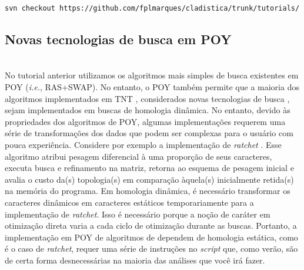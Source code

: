 \begin{center}
\small \texttt{svn checkout https://github.com/fplmarques/cladistica/trunk/tutorials/}\\
\end{center}


\newpage
\pagestyle{fancy} %
\begin{refsection}
\renewcommand*{\finalnamedelim}{\addspace\&\space} %
%
\newcommand{\A}{\textcolor{green}{\textbf{A}}}
\newcommand{\C}{\textcolor{blue}{\textbf{C}}}
\newcommand{\G}{\textcolor{gray}{\textbf{G}}}
\newcommand{\T}{\textcolor{red}{\textbf{T}}}
\newcommand{\gap}{\textcolor{black}{\textbf{-}}}


\section{Novas tecnologias de busca em POY}\label{tut10:search}\\

No tutorial anterior utilizamos os algoritmos mais simples de busca existentes em POY (\textit{i.e.}, RAS+SWAP). No entanto, o POY também permite que a maioria dos algoritmos implementados em TNT \parencite{GoloboffEtAl_2008}, considerados novas tecnologias de busca \parencite{Goloboff_1999,Nixon_1999}, sejam implementados em buscas de homologia dinâmica. No entanto, devido às propriedades dos algoritmos de POY, algumas implementações requerem uma série de transformações dos dados que podem ser complexas para o usuário com pouca experiência. Considere por exemplo a implementação de \textit{ratchet} \parencite{Nixon_1999}. Esse algoritmo atribui pesagem diferencial à uma proporção de seus caracteres, executa busca e refinamento na matriz, retorna ao esquema de pesagem inicial e avalia o custo da(s) topologia(s) em comparação àquela(s) inicialmente retida(s) na memória do programa. Em homologia dinâmica, é necessário transformar os caracteres dinâmicos em caracteres estáticos temporariamente para a implementação de \textit{ratchet}. Isso é necessário porque a noção de caráter em otimização direta varia a cada ciclo de otimização durante as buscas. Portanto, a implementação em POY de algoritmos de dependem de homologia estática, como é o caso de \textit{ratchet}, requer uma série de instruções no \textit{script} que, como verão, são de certa forma desnecessárias na maioria das análises que você irá fazer.


\end{refsection}
